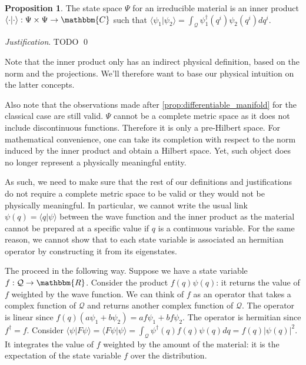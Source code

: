 \documentclass[aps,pra,10pt,twocolumn,floatfix,nofootinbib]{revtex4-1}
\numberwithin{equation}{section}
\theoremstyle{definition}
\newtheorem{prop}[equation]{Proposition}
\newenvironment{justification}{\emph{Justification}.}{\qed}
\begin{document}
\begin{prop}\label{prop:inner_product}
	The state space $\Psi$ for an irreducible material is an inner product $\langle \cdot |\cdot \rangle : \Psi \times \Psi \rightarrow \mathbbm{C}$ such that $\langle \psi_1 | \psi_2 \rangle = \int_\mathcal{Q} \psi_1^\dagger (q^i) \psi_2(q^i) dq^i$.
\end{prop}
\begin{justification}
	TODO
\end{justification}

Note that the inner product only has an indirect physical definition, based on the norm and the projections. We'll therefore want to base our physical intuition on the latter concepts.

Also note that the observations made after \ref{prop:differentiable_manifold} for the  classical case are still valid. $\Psi$ cannot be a complete metric space as it does not include discontinuous functions. Therefore it is only a pre-Hilbert space. For mathematical convenience, one can take its completion with respect to the norm induced by the inner product and obtain a Hilbert space. Yet, such object does no longer represent a physically meaningful entity.

As such, we need to make sure that the rest of our definitions and justifications do not require a complete metric space to be valid or they would not be physically meaningful. In particular, we cannot write the usual link $\psi(q) = \langle q | \psi \rangle$ between the wave function and the inner product as the material cannot be prepared at a specific value if $q$ is a continuous variable. For the same reason, we cannot show that to each state variable is associated an hermitian operator by constructing it from its eigenstates.

The proceed in the following way. Suppose we have a state variable $f : \mathcal{Q} \rightarrow \mathbbm{R}$. Consider the product $f (q) \psi (q)$: it returns the value of $f$ weighted by the wave function. We can think of $f$ as an operator that takes a complex function of $\mathcal{Q}$ and returns another complex function of $\mathcal{Q}$. The operator is linear since $f (q) (a\psi_1 + b\psi_2) = a f \psi_1 + b f  \psi_2$. The operator is hermitian since $f^\dagger = f$. Consider $\langle \psi | F \psi \rangle = \langle F \psi | \psi \rangle = \int_\mathcal{Q} \psi^\dagger (q) f(q) \psi(q) dq = f(q) | \psi(q)|^2$. It integrates the value of $f$ weighted by the amount of the material: it is the expectation of the state variable $f$ over the distribution. 
\end{document}
